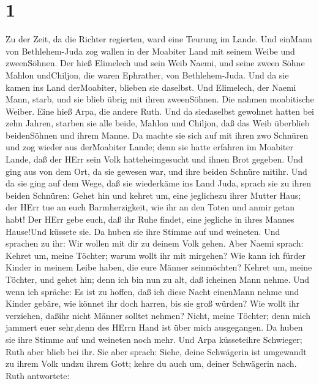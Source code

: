 \hypertarget{section}{%
\section{1}\label{section}}

 Zu der Zeit, da die Richter regierten, ward eine Teurung im
Lande. Und einMann von Bethlehem-Juda zog wallen in der Moabiter Land
mit seinem Weibe und zweenSöhnen.  Der hieß Elimelech und
sein Weib Naemi, und seine zween Söhne Mahlon undChiljon, die waren
Ephrather, von Bethlehem-Juda. Und da sie kamen ins Land derMoabiter,
blieben sie daselbst.  Und Elimelech, der Naemi Mann, starb,
und sie blieb übrig mit ihren zweenSöhnen.  Die nahmen
moabitische Weiber. Eine hieß Arpa, die andere Ruth. Und da siedaselbst
gewohnet hatten bei zehn Jahren,  starben sie alle beide,
Mahlon und Chiljon, daß das Weib überblieb beidenSöhnen und ihrem Manne.
 Da machte sie sich auf mit ihren zwo Schnüren und zog
wieder aus derMoabiter Lande; denn sie hatte erfahren im Moabiter Lande,
daß der HErr sein Volk hatteheimgesucht und ihnen Brot gegeben.
 Und ging aus von dem Ort, da sie gewesen war, und ihre
beiden Schnüre mitihr. Und da sie ging auf dem Wege, daß sie wiederkäme
ins Land Juda,  sprach sie zu ihren beiden Schnüren: Gehet
hin und kehret um, eine jeglichezu ihrer Mutter Haus; der HErr tue an
euch Barmherzigkeit, wie ihr an den Toten und anmir getan habt!
 Der HErr gebe euch, daß ihr Ruhe findet, eine jegliche in
ihres Mannes Hause!Und küssete sie. Da huben sie ihre Stimme auf und
weineten.  Und sprachen zu ihr: Wir wollen mit dir zu
deinem Volk gehen.  Aber Naemi sprach: Kehret um, meine
Töchter; warum wollt ihr mit mirgehen? Wie kann ich fürder Kinder in
meinem Leibe haben, die eure Männer seinmöchten?  Kehret
um, meine Töchter, und gehet hin; denn ich bin nun zu alt, daß icheinen
Mann nehme. Und wenn ich spräche: Es ist zu hoffen, daß ich diese Nacht
einenMann nehme und Kinder gebäre,  wie könnet ihr doch
harren, bis sie groß würden? Wie wollt ihr verziehen, daßihr nicht
Männer solltet nehmen? Nicht, meine Töchter; denn mich jammert euer
sehr,denn des HErrn Hand ist über mich ausgegangen.  Da
huben sie ihre Stimme auf und weineten noch mehr. Und Arpa küsseteihre
Schwieger; Ruth aber blieb bei ihr.  Sie aber sprach:
Siehe, deine Schwägerin ist umgewandt zu ihrem Volk undzu ihrem Gott;
kehre du auch um, deiner Schwägerin nach.  Ruth antwortete:
